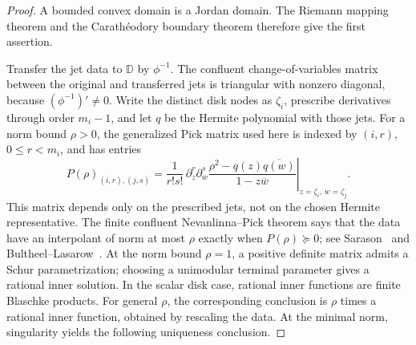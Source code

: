 \documentclass[preprints,article,submit,oneauthor]{Definitions/mdpi}
\numberwithin{equation}{section}
\newcommand{\D}{\mathbb D}
\begin{document}
\begin{proof}
A bounded convex domain is a Jordan domain.  The Riemann mapping theorem and
the Carath\'eodory boundary theorem therefore give the first assertion.

Transfer the jet data to \(\D\) by \(\phi^{-1}\).  The confluent
change-of-variables matrix between the original and transferred jets is
triangular with nonzero diagonal, because \((\phi^{-1})'\neq0\).  Write the
distinct disk nodes as \(\zeta_i\), prescribe derivatives through order
\(m_i-1\), and let \(q\) be the Hermite polynomial with those jets.  For a norm
bound \(\rho>0\), the generalized Pick matrix used here is indexed by
\((i,r)\), \(0\leq r<m_i\), and has entries
\[
 P(\rho)_{(i,r),(j,s)}=
 \left.
 \frac{1}{r!s!}\,
 \partial_z^r\partial_{\overline w}^{s}
 \frac{\rho^2-q(z)\overline{q(w)}}{1-z\overline w}
 \right|_{z=\zeta_i,\,w=\zeta_j}.                  \tag{3.10}
\]
This matrix depends only on the prescribed jets, not on the chosen Hermite
representative.  The finite confluent Nevanlinna--Pick theorem says that the
data have an interpolant of norm at most \(\rho\) exactly when
\(P(\rho)\succeq0\); see
Sarason~\cite{Sarason1967} and
Bultheel--Lasarow~\cite{BultheelLasarow2008}.  At the norm bound
\(\rho=1\), a positive definite matrix admits a Schur parametrization; choosing
a unimodular terminal parameter gives a rational inner solution.  In the scalar
disk case, rational inner functions are finite Blaschke products.  For general
\(\rho\), the corresponding conclusion is \(\rho\) times a rational inner
function, obtained by rescaling the data.  At the minimal norm, singularity
yields the following uniqueness conclusion.


\end{proof}
\end{document}
